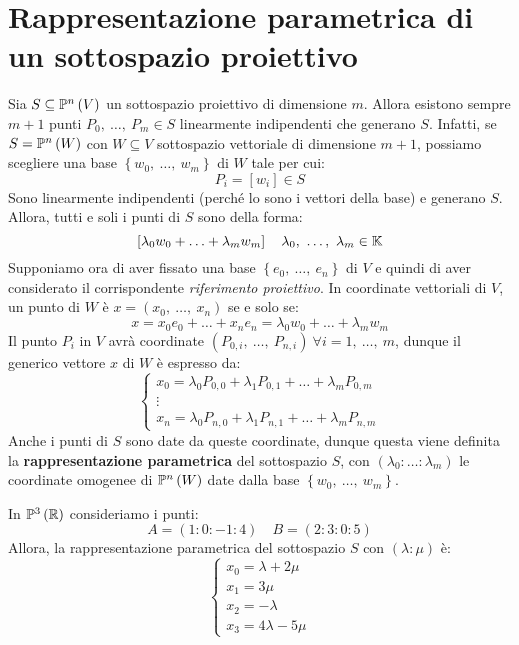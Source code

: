 \section{Rappresentazione parametrica di un sottospazio proiettivo}
Sia $S\subseteq\proj{V}$ un sottospazio proiettivo di dimensione $m$. Allora esistono sempre $m+1$ punti $P_0,\ \ldots,\ P_m\in S$ linearmente indipendenti che generano $S$. Infatti, se $S=\proj{W}$ con $W\subseteq V$ sottospazio vettoriale di dimensione $m+1$, possiamo scegliere una base $\left\{w_0,\ \ldots,\ w_m\right\}$ di $W$ tale per cui:
\begin{equation*}
	P_i=\left[w_i\right]\in S
\end{equation*}
Sono linearmente indipendenti (perché lo sono i vettori della base) e generano $S$.\\
Allora, tutti e soli i punti di $S$ sono della forma:
\begin{equation*}
	\left[\lambda_0 w_0+\ldots+\lambda_m w_m\right]\quad \lambda_0,\ \ldots,\ \lambda_m\in\kamp
\end{equation*}
Supponiamo ora di aver fissato una base $\left\{e_0,\ \ldots,\ e_n\right\}$ di $V$ e quindi di aver considerato il corrispondente \textit{riferimento proiettivo}. In coordinate vettoriali di $V$, un punto di $W$ è $x=\left(x_0,\ \ldots,\ x_n\right)$ se e solo se:
\begin{equation*}
	x=x_0e_0+\ldots+x_ne_n=\lambda_0 w_0+\ldots+\lambda_m w_m
\end{equation*}
Il punto $P_i$ in $V$ avrà coordinate $\left(P_{0,i},\ \ldots,\ P_{n,i}\right)\ \forall i=1,\ \ldots,\ m$, dunque il generico vettore $x$ di $W$ è espresso da:
\begin{equation}
	\begin{cases}
		x_0=\lambda_0 P_{0,0}+\lambda_1P_{0,1}+\ldots+\lambda_mP_{0,m}\\
		\vdots\\
		x_n=\lambda_0 P_{n,0}+\lambda_1P_{n,1}+\ldots+\lambda_mP_{n,m}
	\end{cases}
\end{equation}
Anche i punti di $S$ sono date da queste coordinate, dunque questa viene definita la \textbf{rappresentazione parametrica} del sottospazio $S$, con $\left(\lambda_0\colon\ldots\colon\lambda_m\right)$ le coordinate omogenee di $\proj{W}$ date dalla base $\left\{w_0,\ \ldots,\ w_m\right\}$.
\begin{example}
	In $\proj[3]{\realset}$ consideriamo i punti:
	\begin{equation*}
		A=\left(1\colon 0\colon -1\colon 4\right)\quad B=\left(2\colon 3\colon 0\colon 5\right)
	\end{equation*}
Allora, la rappresentazione parametrica del sottospazio $S$ con $\left(\lambda\colon \mu\right)$ è:
\begin{equation*}
	\begin{cases}
		x_0=\lambda+2\mu\\
		x_1=3\mu\\
		x_2=-\lambda\\
		x_3=4\lambda-5\mu
	\end{cases}
\end{equation*}
\end{example}

